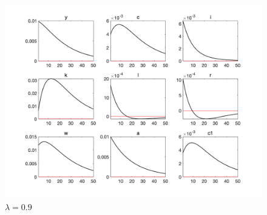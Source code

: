 \documentclass[a4paper,12pt]{ctexart}
\begin{document}
\begin{figure}[H]
\begin{minipage}{0.48\linewidth}
        \includegraphics[width=\linewidth]{img/figure0.9.png}
        \caption{$\lambda=0.9$}
    \end{minipage}
\end{figure}
\end{document}
